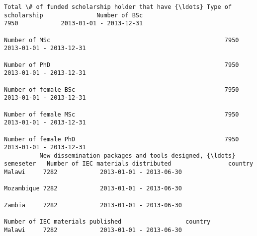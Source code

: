 \documentclass[11pt]{article}
\begin{document}
\begin{Verbatim}[commandchars=\\\{\}]
                                                                         Total \# of funded scholarship holder that have {\ldots} Type of scholarship               Number of BSc                                                 7950            2013-01-01 - 2013-12-31   
                                                                                                                                                              Number of MSc                                                 7950            2013-01-01 - 2013-12-31   
                                                                                                                                                              Number of PhD                                                 7950            2013-01-01 - 2013-12-31   
                                                                                                                                                              Number of female BSc                                          7950            2013-01-01 - 2013-12-31   
                                                                                                                                                              Number of female MSc                                          7950            2013-01-01 - 2013-12-31   
                                                                                                                                                              Number of female PhD                                          7950            2013-01-01 - 2013-12-31   
          New dissemination packages and tools designed, {\ldots} semeseter   Number of IEC materials distributed                country                                                                              Malawi     7282            2013-01-01 - 2013-06-30   
                                                                                                                                                                                                                 Mozambique 7282            2013-01-01 - 2013-06-30   
                                                                                                                                                                                                                 Zambia     7282            2013-01-01 - 2013-06-30   
                                                                         Number of IEC materials published                  country                                                                              Malawi     7282            2013-01-01 - 2013-06-30   

\end{Verbatim}
\end{document}
